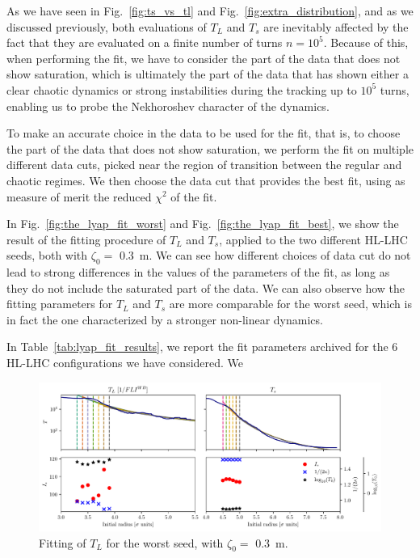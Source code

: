 As we have seen in Fig.~\ref{fig:ts_vs_tl} and Fig.~\ref{fig:extra_distribution}, and as we discussed previously, both evaluations of $T_L$ and $T_s$ are inevitably affected by the fact that they are evaluated on a finite number of turns $n=10^5$. Because of this, when performing the fit, we have to consider the part of the data that does not show saturation, which is ultimately the part of the data that has shown either a clear chaotic dynamics or strong instabilities during the tracking up to $10^5$ turns, enabling us to probe the Nekhoroshev character of the dynamics.

To make an accurate choice in the data to be used for the fit, that is, to choose the part of the data that does not show saturation, we perform the fit on multiple different data cuts, picked near the region of transition between the regular and chaotic regimes. We then choose the data cut that provides the best fit, using as measure of merit the reduced $\chi^2$ of the fit.

In Fig.~\ref{fig:the_lyap_fit_worst} and Fig.~\ref{fig:the_lyap_fit_best}, we show the result of the fitting procedure of $T_L$ and $T_s$, applied to the two different HL-LHC seeds, both with $\zeta_0=$ \SI{0.3}{\meter}. We can see how different choices of data cut do not lead to strong differences in the values of the parameters of the fit, as long as they do not include the saturated part of the data. We can also observe how the fitting parameters for $T_L$ and $T_s$ are more comparable for the worst seed, which is in fact the one characterized by a stronger non-linear dynamics.

In Table~\ref{tab:lyap_fit_results}, we report the fit parameters archived for the 6 HL-LHC configurations we have considered. We

\begin{figure}
    \centering
    \includegraphics[width=1\textwidth]{6_lhc_dynamic_indicators/figs/fit_l_time_bad.pdf}
    \caption{Fitting of $T_L$ for the worst seed, with $\zeta_0=$ \SI{0.3}{\meter}.}
\end{figure}

